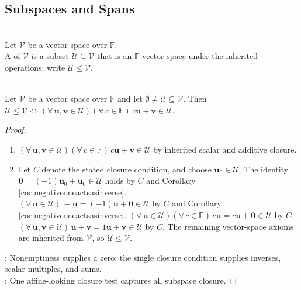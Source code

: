 \subsection{Subspaces and Spans}

\begin{definition} \label{def:subspace} \\
\leanok Let $\mathcal{V}$ be a vector space over $\mathbb{F}$.\\
A  of $\mathcal{V}$ is a subset $\mathcal{U}\subseteq\mathcal{V}$ that is an $\mathbb{F}$-vector space under the inherited operations; write $\mathcal{U}\leq\mathcal{V}$.
\end{definition}

\begin{theorem} \label{thm:subspacetest} \\
\leanok Let $\mathcal{V}$ be a vector space over $\mathbb{F}$ and let $\emptyset\neq\mathcal{U}\subseteq\mathcal{V}$. Then $\mathcal{U}\leq\mathcal{V}\iff(\forall\,\mathbf{u},\mathbf{v}\in\mathcal{U})(\forall\,c\in\mathbb{F})\,c\mathbf{u}+\mathbf{v}\in\mathcal{U}$.
\begin{proof}
\leanok
\begin{enumerate}[label=\roman*.]
\setlength{\itemsep}{0pt}
\item[$(\Rightarrow)$] $(\forall\,\mathbf{u},\mathbf{v}\in\mathcal{U})(\forall\,c\in\mathbb{F})\,c\mathbf{u}+\mathbf{v}\in\mathcal{U}$ by inherited scalar and additive closure.
\item[$(\Leftarrow)$] Let $C$ denote the stated closure condition, and choose $\mathbf{u}_0\in\mathcal{U}$. The identity $\mathbf{0}=(-1)\mathbf{u}_0+\mathbf{u}_0\in\mathcal{U}$ holds by $C$ and Corollary \ref{cor:negativeoneactsasinverse}.\\
$(\forall\,\mathbf{u}\in\mathcal{U})\,-\mathbf{u}=(-1)\mathbf{u}+\mathbf{0}\in\mathcal{U}$ by $C$ and Corollary \ref{cor:negativeoneactsasinverse}. $(\forall\,\mathbf{u}\in\mathcal{U})(\forall\,c\in\mathbb{F})\,c\mathbf{u}=c\mathbf{u}+\mathbf{0}\in\mathcal{U}$ by $C$.\\
$(\forall\,\mathbf{u},\mathbf{v}\in\mathcal{U})\,\mathbf{u}+\mathbf{v}=1\mathbf{u}+\mathbf{v}\in\mathcal{U}$ by $C$. The remaining vector-space axioms are inherited from $\mathcal{V}$, so $\mathcal{U}\leq\mathcal{V}$.
\end{enumerate}
: Nonemptiness supplies a zero; the single closure condition supplies inverses, scalar multiples, and sums.\\
: One affine-looking closure test captures all subspace closure.
\end{proof}
\end{theorem}

